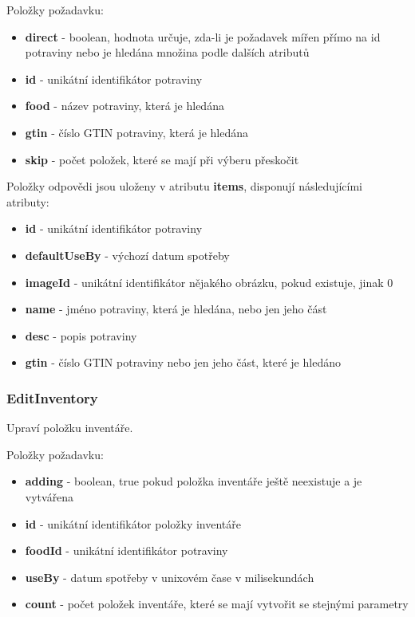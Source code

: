 \documentclass[thesis=B,czech]{FITthesis}[2013/10/20]
\begin{document}
Položky požadavku:
\begin{itemize}
  \item \textbf{direct} - boolean, hodnota určuje, zda-li je požadavek mířen přímo na id potraviny nebo je hledána množina podle dalších atributů
  \item \textbf{id} - unikátní identifikátor potraviny
  \item \textbf{food} - název potraviny, která je hledána
  \item \textbf{gtin} - číslo GTIN potraviny, která je hledána
  \item \textbf{skip} - počet položek, které se mají při výberu přeskočit
\end{itemize}

Položky odpovědi jsou uloženy v atributu \textbf{items}, disponují následujícími atributy:
\begin{itemize}
  \item \textbf{id} - unikátní identifikátor potraviny
  \item \textbf{defaultUseBy} - výchozí datum spotřeby
  \item \textbf{imageId} - unikátní identifikátor nějakého obrázku, pokud existuje, jinak 0
  \item \textbf{name} - jméno potraviny, která je hledána, nebo jen jeho část
  \item \textbf{desc} - popis potraviny
  \item \textbf{gtin} - číslo GTIN potraviny nebo jen jeho část, které je hledáno
\end{itemize}


\subsubsection{EditInventory}
Upraví položku inventáře.

Položky požadavku:
\begin{itemize}
  \item \textbf{adding} - boolean, true pokud položka inventáře ještě neexistuje a je vytvářena
  \item \textbf{id} - unikátní identifikátor položky inventáře
  \item \textbf{foodId} - unikátní identifikátor potraviny
  \item \textbf{useBy} - datum spotřeby v unixovém čase v milisekundách
  \item \textbf{count} - počet položek inventáře, které se mají vytvořit se stejnými parametry
\end{itemize}
\end{document}
